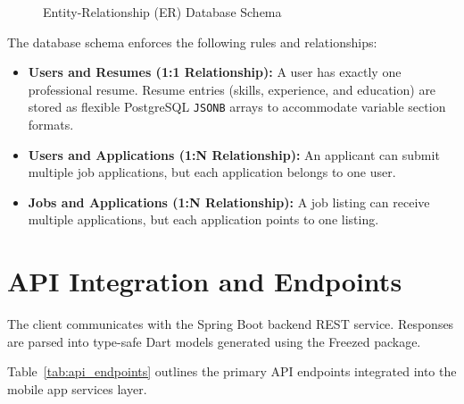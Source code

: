 \begin{figure}[htbp]
\caption{Entity-Relationship (ER) Database Schema}
\label{fig:er_diagram}
\end{figure}

The database schema enforces the following rules and relationships:
\begin{itemize}
    \item \textbf{Users and Resumes (1:1 Relationship):} A user has exactly one professional resume. Resume entries (skills, experience, and education) are stored as flexible PostgreSQL \texttt{JSONB} arrays to accommodate variable section formats.
    \item \textbf{Users and Applications (1:N Relationship):} An applicant can submit multiple job applications, but each application belongs to one user.
    \item \textbf{Jobs and Applications (1:N Relationship):} A job listing can receive multiple applications, but each application points to one listing.
\end{itemize}

\section{API Integration and Endpoints}
The client communicates with the Spring Boot backend REST service. Responses are parsed into type-safe Dart models generated using the Freezed package.

Table~\ref{tab:api_endpoints} outlines the primary API endpoints integrated into the mobile app services layer.

